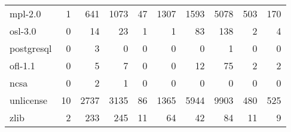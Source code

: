 {\begin{tabular}{@{}l r r r r r r r r r@{}}
mpl-2.0            &     1   &     641    &     1073   &     47   &     1307  &     1593   &     5078       &     503   &     170        \\
osl-3.0            &     0   &     14     &     23     &     1    &     1     &     83     &     138        &     2     &     4          \\
postgresql         &     0   &     3      &     0      &     0    &     0     &     0      &     1          &     0     &     0          \\
ofl-1.1            &     0   &     5      &     7      &     0    &     0     &     12     &     75         &     2     &     2          \\
ncsa               &     0   &     2      &     1      &     0    &     0     &     0      &     0          &     0     &     0          \\
unlicense          &     10  &     2737   &     3135   &     86   &     1365  &     5944   &     9903       &     480   &     525        \\
zlib               &     2   &     233    &     245    &     11   &     64    &     42     &     84         &     11    &     9          \\
\bottomrule
\end{tabular}}

\vfill
